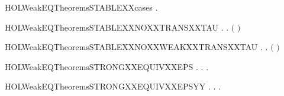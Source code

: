 \begin{SaveVerbatim}{HOLWeakEQTheoremsSTABLEXXcases}
\HOLTokenTurnstile{} \HOLSymConst{\HOLTokenForall{}}.   \HOLSymConst{\HOLTokenDisj{}} \HOLSymConst{\HOLTokenNeg{}} 
\end{SaveVerbatim}
\newcommand{\HOLWeakEQTheoremsSTABLEXXcases}{\UseVerbatim{HOLWeakEQTheoremsSTABLEXXcases}}
\begin{SaveVerbatim}{HOLWeakEQTheoremsSTABLEXXNOXXTRANSXXTAU}
\HOLTokenTurnstile{} \HOLSymConst{\HOLTokenForall{}}.   \HOLSymConst{\HOLTokenImp{}} \HOLSymConst{\HOLTokenForall{}}. \HOLSymConst{\HOLTokenNeg{}}\ensuremath{(} \HOLTokenTransBegin\HOLConst{\ensuremath{\tau}}\HOLTokenTransEnd {}\ensuremath{)}
\end{SaveVerbatim}
\newcommand{\HOLWeakEQTheoremsSTABLEXXNOXXTRANSXXTAU}{\UseVerbatim{HOLWeakEQTheoremsSTABLEXXNOXXTRANSXXTAU}}
\begin{SaveVerbatim}{HOLWeakEQTheoremsSTABLEXXNOXXWEAKXXTRANSXXTAU}
\HOLTokenTurnstile{} \HOLSymConst{\HOLTokenForall{}}.   \HOLSymConst{\HOLTokenImp{}} \HOLSymConst{\HOLTokenForall{}}. \HOLSymConst{\HOLTokenNeg{}}\ensuremath{(} \HOLTokenWeakTransBegin\HOLConst{\ensuremath{\tau}}\HOLTokenWeakTransEnd {}\ensuremath{)}
\end{SaveVerbatim}
\newcommand{\HOLWeakEQTheoremsSTABLEXXNOXXWEAKXXTRANSXXTAU}{\UseVerbatim{HOLWeakEQTheoremsSTABLEXXNOXXWEAKXXTRANSXXTAU}}
\begin{SaveVerbatim}{HOLWeakEQTheoremsSTRONGXXEQUIVXXEPS}
\HOLTokenTurnstile{} \HOLSymConst{\HOLTokenForall{}} .
          \HOLSymConst{\HOLTokenImp{}}
       \HOLSymConst{\HOLTokenForall{}}.    \HOLSymConst{\HOLTokenImp{}} \HOLSymConst{\HOLTokenExists{}}.    \HOLSymConst{\HOLTokenConj{}}   
\end{SaveVerbatim}
\newcommand{\HOLWeakEQTheoremsSTRONGXXEQUIVXXEPS}{\UseVerbatim{HOLWeakEQTheoremsSTRONGXXEQUIVXXEPS}}
\begin{SaveVerbatim}{HOLWeakEQTheoremsSTRONGXXEQUIVXXEPSYY}
\HOLTokenTurnstile{} \HOLSymConst{\HOLTokenForall{}} .
          \HOLSymConst{\HOLTokenImp{}}
       \HOLSymConst{\HOLTokenForall{}}.    \HOLSymConst{\HOLTokenImp{}} \HOLSymConst{\HOLTokenExists{}}.    \HOLSymConst{\HOLTokenConj{}}   
\end{SaveVerbatim}
